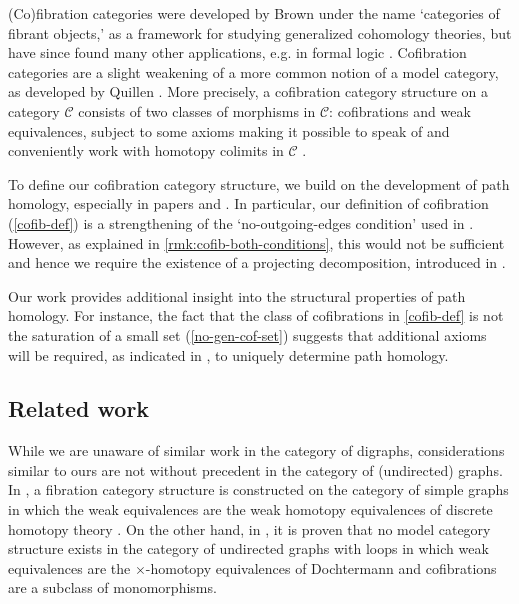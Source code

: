 \documentclass[11pt]{article}
\theoremstyle{definition}
\numberwithin{equation}{section}
\newcommand{\C}{\mathcal{C}}
\begin{document}
(Co)fibration categories were developed by Brown \cite{brown:abstract-homotopy-theory} under the name `categories of fibrant objects,' as a framework for studying generalized cohomology theories, but have since found many other applications, e.g. in formal logic \cite{avigad-kapulkin-lumsdaine}.
Cofibration categories are a slight weakening of a more common notion of a model category, as developed by Quillen \cite{quillen:book}.
More precisely, a cofibration category structure on a category $\C$ consists of two classes of morphisms in $\C$: cofibrations and weak equivalences, subject to some axioms making it possible to speak of and conveniently work with homotopy colimits in $\C$ \cite{szumilo:two-models,kapulkin-szumilo}.

To define our cofibration category structure, we build on the development of path homology, especially in papers \cite{grigor'yan-jimenez-muranov-yau} and \cite{grigor'yan-muranov-yau}.
In particular, our definition of cofibration (\cref{cofib-def}) is a strengthening of the `no-outgoing-edges condition' used in \cite[\S5]{grigor'yan-jimenez-muranov-yau}.
However, as explained in \cref{rmk:cofib-both-conditions}, this would not be sufficient and hence we require the existence of a projecting decomposition, introduced in \cite{leinster:magnitude-graph}.

Our work provides additional insight into the structural properties of path homology.
For instance, the fact that the class of cofibrations in \cref{cofib-def} is not the saturation of a small set (\cref{no-gen-cof-set}) suggests that additional axioms will be required, as indicated in \cite[Rmk.~5.3]{grigor'yan-jimenez-muranov-yau}, to uniquely determine path homology.

\subsection{Related work}
While we are unaware of similar work in the category of digraphs, considerations similar to ours are not without precedent in the category of (undirected) graphs.
In \cite{carranza-kapulkin:cubical-setting}, a fibration category structure is constructed on the category of simple graphs in which the weak equivalences are the weak homotopy equivalences of discrete homotopy theory \cite{babson-barcelo-longueville-laubenbacher}.
On the other hand, in \cite{goyal-santhanam}, it is proven that no model category structure exists in the category of undirected graphs with loops in which weak equivalences are the $\times$-homotopy equivalences of Dochtermann \cite{dochtermann} and cofibrations are a subclass of monomorphisms.
\end{document}
